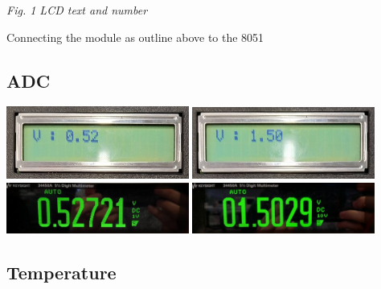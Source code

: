 \documentclass[11pt]{article}
\begin{document}
\begin{preview}
\begin{center}
                \textit{Fig. 1 LCD text and number}
        \end{center}

        Connecting the module as outline above to the 8051
        
        

        \subsection{ADC}
        \begin{center}
                \includegraphics[width=0.45\textwidth]{res/vmeasure0.jpg}
                \includegraphics[width=0.45\textwidth]{res/vmeasure1.jpg}
                \includegraphics[width=0.45\textwidth]{res/vactual0.jpg}
                \includegraphics[width=0.45\textwidth]{res/vactual1.jpg}
        \end{center}

        

        \subsection{Temperature}
        

\end{preview}
\end{document}
